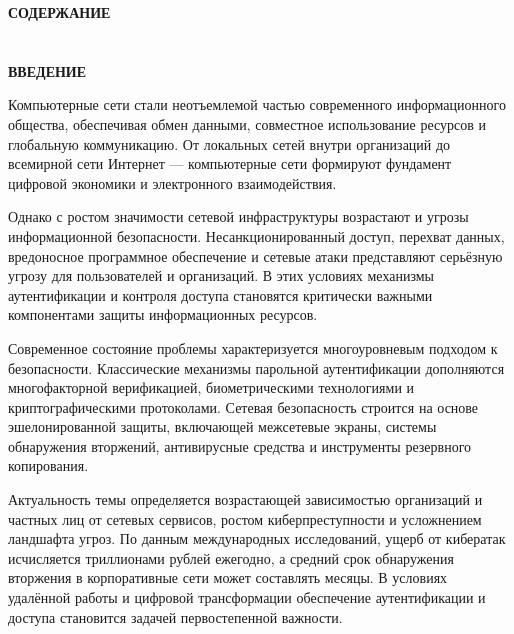 \documentclass{SibFU-docs}
\begin{document}
\newpage

\thispagestyle{empty}
\begin{center}
\bfseries СОДЕРЖАНИЕ
\end{center}
\vspace{-6pt}
\tableofcontents
\clearpage

\section*{}
\vspace*{-2.5em}
\begin{center}\textbf{ВВЕДЕНИЕ}\end{center}
{}

Компьютерные сети стали неотъемлемой частью современного информационного общества, обеспечивая обмен данными, совместное использование ресурсов и глобальную коммуникацию. От локальных сетей внутри организаций до всемирной сети Интернет --- компьютерные сети формируют фундамент цифровой экономики и электронного взаимодействия.

Однако с ростом значимости сетевой инфраструктуры возрастают и угрозы информационной безопасности. Несанкционированный доступ, перехват данных, вредоносное программное обеспечение и сетевые атаки представляют серьёзную угрозу для пользователей и организаций. В этих условиях механизмы аутентификации и контроля доступа становятся критически важными компонентами защиты информационных ресурсов.

Современное состояние проблемы характеризуется многоуровневым подходом к безопасности. Классические механизмы парольной аутентификации дополняются многофакторной верификацией, биометрическими технологиями и криптографическими протоколами. Сетевая безопасность строится на основе эшелонированной защиты, включающей межсетевые экраны, системы обнаружения вторжений, антивирусные средства и инструменты резервного копирования.

Актуальность темы определяется возрастающей зависимостью организаций и частных лиц от сетевых сервисов, ростом киберпреступности и усложнением ландшафта угроз. По данным международных исследований, ущерб от кибератак исчисляется триллионами рублей ежегодно, а средний срок обнаружения вторжения в корпоративные сети может составлять месяцы. В условиях удалённой работы и цифровой трансформации обеспечение аутентификации и доступа становится задачей первостепенной важности.
\end{document}
